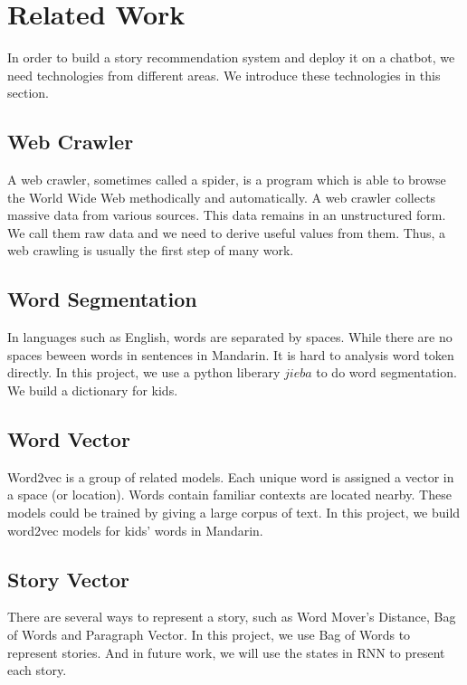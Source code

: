 \documentclass[sigconf]{acmart}
\begin{document}

\section{Related Work}
In order to build a story recommendation system and deploy it on a chatbot, we need technologies from different areas. We introduce these technologies in this section.

\subsection{Web Crawler}
A web crawler, sometimes called a spider, is a program which is able to browse the World Wide Web methodically and automatically\cite{dhenakaran2011web}. A web crawler collects massive data from various sources. This data remains in an unstructured form. We call them raw data and we need to derive useful values from them. Thus, a web crawling is usually the first step of many work.

\subsection{Word Segmentation}
In languages such as English, words are separated by spaces. While there are no spaces beween words in sentences in Mandarin. It is hard to analysis word token directly. In this project, we use a python liberary $jieba$ to do word segmentation. We build a  dictionary for kids. 

\subsection{Word Vector}
Word2vec is a group of related models. Each unique word is assigned a vector in a space (or location). Words contain familiar contexts are located nearby\cite{goldberg2014word2vec}. These models could be trained by giving a large corpus of text. In this project, we build word2vec models for kids' words in Mandarin.

\subsection{Story Vector}
There are several ways to represent a story, such as Word Mover's Distance\cite{kusner2015word}, Bag of Words and Paragraph Vector\cite{le2014distributed}. In this project, we use Bag of Words to represent stories. And in future work, we will use the states in RNN to present each story.
\end{document}
